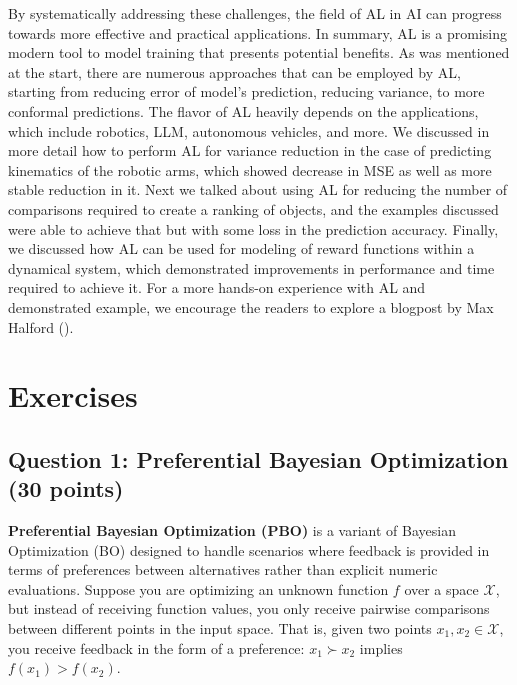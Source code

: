 \documentclass[
  letterpaper,
  numbers=noenddot,
  DIV=11]{scrreprt}
\theoremstyle{plain}
\theoremstyle{definition}
\theoremstyle{remark}
\begin{document}
By systematically addressing these challenges, the field of AL in AI can
progress towards more effective and practical applications. In summary,
AL is a promising modern tool to model training that presents potential
benefits. As was mentioned at the start, there are numerous approaches
that can be employed by AL, starting from reducing error of model's
prediction, reducing variance, to more conformal predictions. The flavor
of AL heavily depends on the applications, which include robotics, LLM,
autonomous vehicles, and more. We discussed in more detail how to
perform AL for variance reduction in the case of predicting kinematics
of the robotic arms, which showed decrease in MSE as well as more stable
reduction in it. Next we talked about using AL for reducing the number
of comparisons required to create a ranking of objects, and the examples
discussed were able to achieve that but with some loss in the prediction
accuracy. Finally, we discussed how AL can be used for modeling of
reward functions within a dynamical system, which demonstrated
improvements in performance and time required to achieve it. For a more
hands-on experience with AL and demonstrated example, we encourage the
readers to explore a blogpost by Max Halford
().

\section{Exercises}\label{exercises-2}

\subsection*{Question 1: Preferential Bayesian Optimization (30
points)}\label{sec-question-1-preferential-bayesian-optimization-30-points}

\textbf{Preferential Bayesian Optimization (PBO)} is a variant of
Bayesian Optimization (BO) designed to handle scenarios where feedback
is provided in terms of preferences between alternatives rather than
explicit numeric evaluations. Suppose you are optimizing an unknown
function \(f\) over a space \(\mathcal{X}\), but instead of receiving
function values, you only receive pairwise comparisons between different
points in the input space. That is, given two points
\(x_1, x_2 \in \mathcal{X}\), you receive feedback in the form of a
preference: \(x_1 \succ x_2\) implies \(f(x_1) > f(x_2)\).
\end{document}
